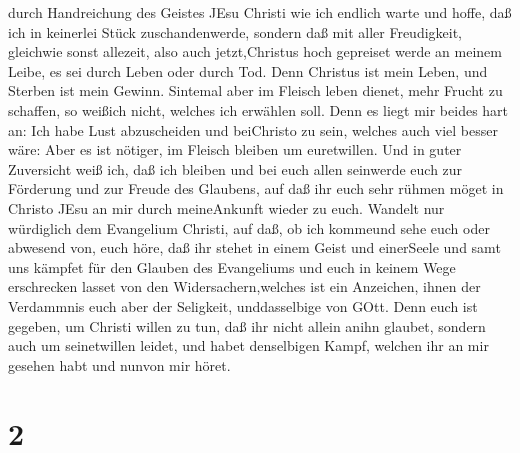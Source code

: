 durch Handreichung des Geistes JEsu Christi  wie ich
endlich warte und hoffe, daß ich in keinerlei Stück zuschandenwerde,
sondern daß mit aller Freudigkeit, gleichwie sonst allezeit, also auch
jetzt,Christus hoch gepreiset werde an meinem Leibe, es sei durch Leben
oder durch Tod.  Denn Christus ist mein Leben, und Sterben
ist mein Gewinn.  Sintemal aber im Fleisch leben dienet,
mehr Frucht zu schaffen, so weißich nicht, welches ich erwählen soll.
 Denn es liegt mir beides hart an: Ich habe Lust
abzuscheiden und beiChristo zu sein, welches auch viel besser wäre:
 Aber es ist nötiger, im Fleisch bleiben um euretwillen.
 Und in guter Zuversicht weiß ich, daß ich bleiben und bei
euch allen seinwerde euch zur Förderung und zur Freude des Glaubens,
 auf daß ihr euch sehr rühmen möget in Christo JEsu an mir
durch meineAnkunft wieder zu euch.  Wandelt nur würdiglich
dem Evangelium Christi, auf daß, ob ich kommeund sehe euch oder abwesend
von, euch höre, daß ihr stehet in einem Geist und einerSeele und samt
uns kämpfet für den Glauben des Evangeliums  und euch in
keinem Wege erschrecken lasset von den Widersachern,welches ist ein
Anzeichen, ihnen der Verdammnis euch aber der Seligkeit, unddasselbige
von GOtt.  Denn euch ist gegeben, um Christi willen zu tun,
daß ihr nicht allein anihn glaubet, sondern auch um seinetwillen leidet,
 und habet denselbigen Kampf, welchen ihr an mir gesehen
habt und nunvon mir höret.

\hypertarget{section-1}{%
\section{2}\label{section-1}}

